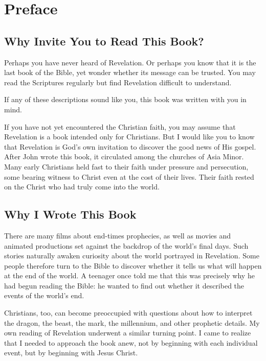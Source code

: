 \chapter*{Preface}


\section*{Why Invite You to Read This Book?}

Perhaps you have never heard of Revelation. Or perhaps you know that it is the last book of the Bible, yet wonder whether its message can be trusted. You may read the Scriptures regularly but find Revelation difficult to understand.

If any of these descriptions sound like you, this book was written with you in mind.

If you have not yet encountered the Christian faith, you may assume that Revelation is a book intended only for Christians. But I would like you to know that Revelation is God's own invitation to discover the good news of His gospel. After John wrote this book, it circulated among the churches of Asia Minor. Many early Christians held fast to their faith under pressure and persecution, some bearing witness to Christ even at the cost of their lives. Their faith rested on the Christ who had truly come into the world.

\section*{Why I Wrote This Book}

There are many films about end-times prophecies, as well as movies and animated productions set against the backdrop of the world's final days. Such stories naturally awaken curiosity about the world portrayed in Revelation. Some people therefore turn to the Bible to discover whether it tells us what will happen at the end of the world. A teenager once told me that this was precisely why he had begun reading the Bible: he wanted to find out whether it described the events of the world's end.

Christians, too, can become preoccupied with questions about how to interpret the dragon, the beast, the mark, the millennium, and other prophetic details. My own reading of Revelation underwent a similar turning point. I came to realize that I needed to approach the book anew, not by beginning with each individual event, but by beginning with Jesus Christ.

